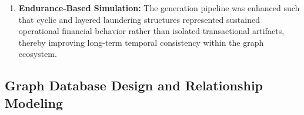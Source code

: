 \documentclass[conference]{IEEEtran}
\begin{document}
\begin{enumerate}
\item \textbf{Endurance-Based Simulation:}
The generation pipeline was enhanced such that cyclic and layered laundering structures represented sustained operational financial behavior rather than isolated transactional artifacts, thereby improving long-term temporal consistency within the graph ecosystem.

\end{enumerate}


\subsection{\textbf{Graph Database Design and Relationship Modeling}}
\end{document}
